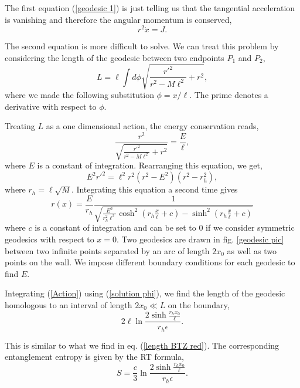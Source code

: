 The first equation (\ref{geodesic 1}) is just telling us that the tangential acceleration is vanishing and therefore the angular momentum is conserved,
\begin{equation}
    r^2\dot x=J.
\end{equation}

The second equation is more difficult to solve. We can treat this problem by considering the length of the geodesic between two endpoints $P_1$ and $P_2$,
\begin{equation}\label{Action}
    L = \ell\int d \phi\sqrt{\frac{r'^2}{r^2-M\ell^2}+r^2},
\end{equation}
where we made the following substitution $\phi=x/\ell$. The prime denotes a derivative with respect to $\phi$.

Treating $L$ as a one dimensional action, the energy conservation reads,
\begin{equation}
    \frac{r^2}{\sqrt{\frac{r'^2}{r^2-M\ell^2}+r^2}}= \frac{E}{\ell},
\end{equation}
where $E$ is a constant of integration. Rearranging this equation, we get,
\begin{equation}
    E^2r'^2 = \ell^2r^2(r^2-E^2)(r^2-r_h^2),
\end{equation}
where $r_h=\ell\sqrt{M}$. Integrating this equation a second time gives
\begin{equation}\label{solution phi}
    r(x) = \frac{E}{r_h}\frac{1}{\sqrt{\frac{E^2}{r_h^2\ell^2}\cosh^2\left(r_h\frac{x}{\ell}+c\right)-\sinh^2\left(r_h\frac{x}{\ell}+c\right)}}
\end{equation}
where $c$ is a constant of integration and can be set to 0 if we consider symmetric geodesics with respect to $x = 0$. Two geodesics are drawn in  fig. \ref{geodesic pic} between two infinite points separated by an arc of length $2x_0$ as well as two points on the wall. We impose different boundary conditions for each geodesic to find $E$.

Integrating (\ref{Action}) using (\ref{solution phi}), we find the length of the geodesic homologous to an interval of length $2x_0\ll L$ on the boundary,
\begin{equation}\label{S1}
    2\ell\ln\frac{2\sinh{\frac{r_h x_0}{\ell}}}{r_h \epsilon}.
\end{equation}
 
This is similar to what we find in eq. (\ref{length BTZ red}). The corresponding entanglement entropy is given by the RT formula,
\begin{equation}
    S = \frac{c}{3}\ln\frac{2\sinh{\frac{r_h x_0}{\ell}}}{r_h \epsilon}.
\end{equation}


